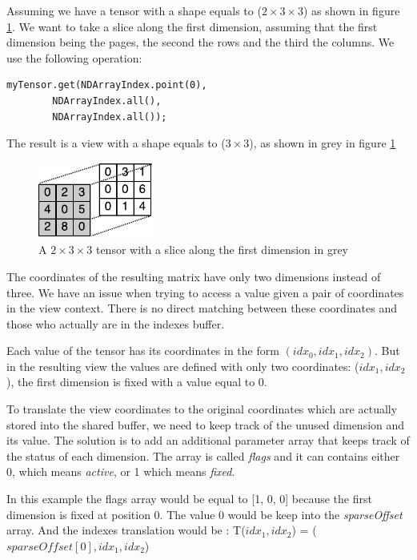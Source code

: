 Assuming we have a tensor with a shape equals to ($2\times 3\times 3$) as shown in figure \ref{fig:pointTensor}. We want to take a slice along the first dimension, assuming that the first dimension being the pages, the second the rows and the third the columns. We use the following operation:
\begin{lstlisting}[style=nonumbers]
	myTensor.get(NDArrayIndex.point(0),
		NDArrayIndex.all(),
		NDArrayIndex.all());
\end{lstlisting} 

The result is a view with a shape equals to ($3\times 3$), as shown in grey in figure \ref{fig:pointTensor}

\begin{figure}[!h]
	\centering
	\includegraphics[width=1.5in]{images/tensorsHiglighted.pdf}
	\caption{A $2\times 3\times 3$ tensor with a slice along the first dimension in grey}
	\label{fig:pointTensor}
\end{figure}

The coordinates of the resulting matrix have only two dimensions instead of three. We have an issue when trying to access a value given a pair of coordinates in the view context. There is no direct matching between these coordinates and those who actually are in the indexes buffer. 

Each value of the tensor has its coordinates in the form $(idx_{0}, idx_{1}, idx_{2})$. But in the resulting view the values are defined with only two coordinates: ($idx_{1}, idx_{2}$), the first dimension is fixed with a value equal to 0. 

To translate the view coordinates to the original coordinates which are actually stored into the shared buffer, we need to keep track of the unused dimension and its value. The solution is to add an additional parameter array that keeps track of the status of each dimension. The array is called \textit{flags} and it can contains either 0, which means \textit{active}, or 1 which means \textit{fixed}.

In this example the flags array would be equal to [1, 0, 0] because the first dimension is fixed at position 0. The value 0 would be keep into the \textit{sparseOffset} array. And the indexes translation would be : T($idx_{1}, idx_{2}$) = ($sparseOffset[0], idx_{1}, idx_{2}$)



